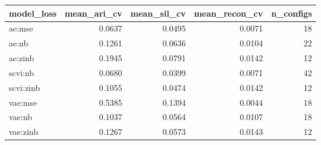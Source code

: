 \begin{tabular}{lrrrr}
\toprule
model\_loss & mean\_ari\_cv & mean\_sil\_cv & mean\_recon\_cv & n\_configs \\
\midrule
ae:mse & 0.0637 & 0.0495 & 0.0071 & 18 \\
ae:nb & 0.1261 & 0.0636 & 0.0104 & 22 \\
ae:zinb & 0.1945 & 0.0791 & 0.0142 & 12 \\
scvi:nb & 0.0680 & 0.0399 & 0.0071 & 42 \\
scvi:zinb & 0.1055 & 0.0474 & 0.0142 & 12 \\
vae:mse & 0.5385 & 0.1394 & 0.0044 & 18 \\
vae:nb & 0.1037 & 0.0564 & 0.0107 & 18 \\
vae:zinb & 0.1267 & 0.0573 & 0.0143 & 12 \\
\bottomrule
\end{tabular}

